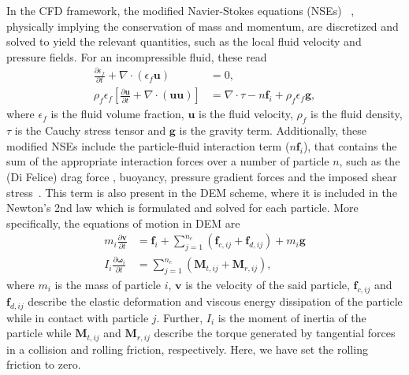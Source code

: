 \documentclass[twoside,twocolumn,9pt]{article}
\begin{document}
In the CFD framework, the modified Navier-Stokes equations (NSEs)
~\cite{anderson1967fluid}, physically implying the conservation of mass 
and momentum, are discretized and solved to yield the relevant quantities, 
such as the local fluid velocity and pressure fields.
For an incompressible fluid, these read~\cite{zhou2010discrete}
\begin{equation}
\begin{split}
 \frac{\partial \epsilon_f}{\partial t} + \nabla \cdot \left( \epsilon_f \mathbf{u} \right) &= 0, \\
 \rho_f \epsilon_f \left[ \frac{\partial \mathbf{u}}{\partial t} + \nabla \cdot \left( \mathbf{u}\mathbf{u} \right) \right] &=
 \nabla \cdot \tau -n\mathbf{f}_i + \rho_f \epsilon_f \mathbf{g} ,
\end{split}
\end{equation}
where $\epsilon_f$ is the fluid volume fraction, $\mathbf{u}$ is the fluid velocity, $\rho_f$ is the fluid density,
$\tau$ is the Cauchy stress tensor and $\mathbf{g}$ is the gravity term.
Additionally, these modified NSEs 
include the 
particle-fluid interaction term ($n\mathbf{f}_i$), that contains the sum of the appropriate 
interaction forces over a number of particle $n$, such as the (Di Felice) drag force \cite{DiFelice1994}, buoyancy, 
pressure gradient forces and the imposed shear stress~\cite{zhu2007discrete}. 
This term is also present in the DEM scheme, where it is included in the 
Newton's 2nd law which is formulated and solved for each particle.
More specifically, the equations of motion in DEM are~\cite{zhou2010discrete}
\begin{equation}
\begin{split}
 m_i\frac{\partial \mathbf{v}}{\partial t} &= \mathbf{f}_i + \sum_{j=1}^{n_c} \left(\mathbf{f}_{c, ij} + \mathbf{f}_{d, ij} \right) + m_i\mathbf{g} \\
 I_i\frac{\partial \mathbf{\omega}_i}{\partial t} &= \sum_{j=1}^{n_c} \left(\mathbf{M}_{t, ij} + \mathbf{M}_{r, ij} \right) ,
\end{split}
 \end{equation}
where $m_i$ is the mass of particle $i$, $\mathbf{v}$ is the velocity of the said particle, $\mathbf{f}_{c, ij}$ and $\mathbf{f}_{d, ij}$ describe the elastic deformation
and viscous energy dissipation of the particle while in contact with particle $j$. Further, $I_i$ is the moment of inertia of the particle while $\mathbf{M}_{t, ij}$ and
$\mathbf{M}_{r, ij}$ describe the torque generated by tangential forces in a collision and rolling friction, respectively. Here, we have set the rolling friction to zero.
\end{document}

